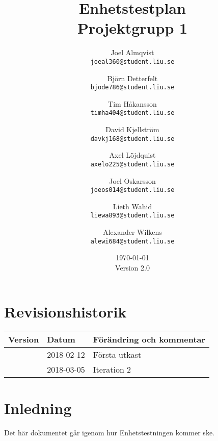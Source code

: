 \documentclass[10pt]{article}
\title{Enhetstestplan\\
    \large Projektgrupp 1}
\author{
    Joel Almqvist\\
    \texttt{joeal360@student.liu.se}
    \and
    Björn Detterfelt\\
    \texttt{bjode786@student.liu.se}
    \and
    Tim Håkansson\\
    \texttt{timha404@student.liu.se}
    \and
    David Kjellström\\
    \texttt{davkj168@student.liu.se}
    \and
    Axel Löjdquist\\
    \texttt{axelo225@student.liu.se}
    \and
    Joel Oskarsson\\
    \texttt{joeos014@student.liu.se}
    \and
    Lieth Wahid\\
    \texttt{liewa893@student.liu.se}
    \and
    Alexander Wilkens\\
    \texttt{alewi684@student.liu.se}
}
\date{\today \\ Version 2.0}
\begin{document}
\maketitle
\pagebreak
	\section*{Revisionshistorik}

	
	\begin{center}
 	   \begin{tabular}{| l | l | p{12cm} |  }
 	       \hline
 	       \textbf{Version} & \textbf{Datum} & \textbf{Förändring och kommentar} \\
 	       \hline
 	       \centering 1.0 & 2018-02-12 & Första utkast\\
		\hline
 	       \centering 2.0 & 2018-03-05 & Iteration 2\\
 	       \hline
 	   \end{tabular}
	\end{center}
\pagebreak
\tableofcontents
\pagebreak

\section{Inledning}
	Det här dokumentet går igenom hur Enhetstestningen kommer ske.


  
	

	
\end{document}
